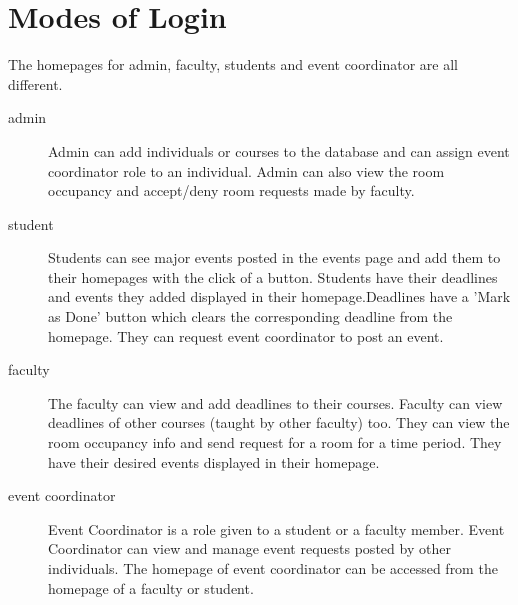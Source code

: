 \documentclass{article}
\begin{document}
\section{Modes of Login}
The homepages for admin, faculty, students and event coordinator are all different. 
\begin{description}

    \item[admin] Admin can add individuals or courses to the database and can assign event coordinator role to an individual. Admin can also view the room occupancy and accept/deny room requests made by faculty.
    \item [student] Students can see major events posted in the events page and add them to their homepages with the click of a button. Students have their deadlines and events they added displayed in their homepage.Deadlines have a 'Mark as Done' button which clears the corresponding deadline from the homepage. They can request event coordinator to post an event.
    \item [faculty] The faculty can view and add deadlines to their courses. Faculty can view deadlines of other courses (taught by other faculty) too. They can view the room occupancy info and send request for a room for a time period. They have their desired events displayed in their homepage.
    \item [event coordinator] Event Coordinator is a role given to a student or a faculty member. Event Coordinator can view and manage event requests posted by other individuals. The homepage of event coordinator can be accessed from the homepage of a faculty or student.
\end{description}
\end{document}
